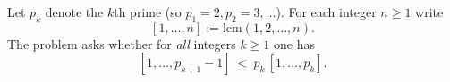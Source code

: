 Let $p_k$ denote the $k$th prime (so $p_1=2,p_2=3,\dots$).  For each integer $n\ge 1$ write
\[[1,\dots,n]:=\mathrm{lcm}(1,2,\dots,n).
\]
The problem asks whether for \emph{all} integers $k\ge 1$ one has
\[[1,\dots,p_{k+1}-1]\ <\ p_k\,[1,\dots,p_k].\]
